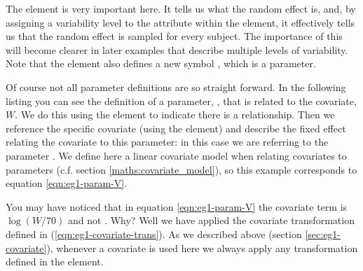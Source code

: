 
The  element is very important here. It tells us
what the random effect is, and, by assigning a variability level to
the attribute  within the  element,
it effectively tells us that the random effect is sampled for every subject.
The importance of this will become clearer in later examples that describe
multiple levels of variability. Note that the  element
also defines a new symbol , which is a parameter.



Of course not all parameter definitions are so straight forward. In the
following listing 
you can see the definition of a
parameter, , that is related to the covariate, $W$. We do this
using the element  to indicate there is a
relationship. Then we reference the specific covariate (using the
 element) and describe the fixed effect relating the
covariate to this parameter: in this case we are referring to the
parameter . We define here a linear covariate model
when relating covariates to parameters (c.f.\xspace section
\ref{maths:covariate_model}), so this example corresponds to
equation \ref{eqn:eg1-param-V}.

You may have noticed that in equation \ref{eqn:eg1-param-V} the
covariate term is $\log\left(W/70\right)$ and not . Why? Well
we have applied the covariate transformation defined in
(\ref{eqn:eg1-covariate-trans}). As we described above (section
\ref{sec:eg1-covariate}), whenever a covariate is used here we always
apply any transformation defined in the 
element.


